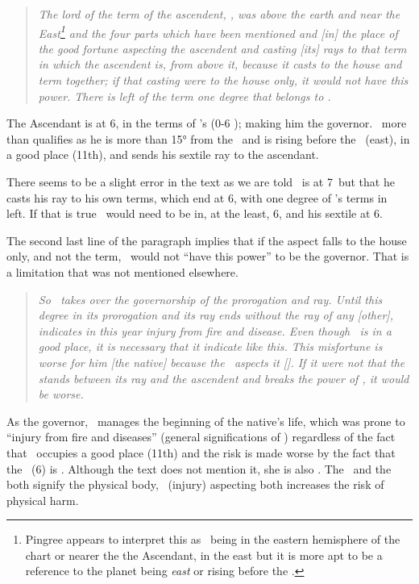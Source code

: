 \begin{quote}
\textsl{The lord of the term of the ascendent, \Mars, was above the earth and near the East\footnote{Pingree appears to interpret this as \Mars\, being in the eastern hemisphere of the chart or nearer the the Ascendant, in the east but it is more apt to be a reference to the planet being \textsl{east} or rising before the \Sun.} and the four parts which have been mentioned and [in] the place of the good fortune aspecting the ascendent and casting [its] rays to that term in which the ascendent is, from above it, because it casts to the house and term together; if that casting were to the house only, it would not have this power. There is left of the term one degree that belongs to \Mars.}
\end{quote}

The Ascendant is at 6\Scorpio, in the terms of \Mars's (0-6 \Scorpio); making him the governor. \Mars\, more than qualifies as he is more than 15° from the \Sun\, and is rising before the \Sun\, (east), in a good place (11th), and sends his sextile ray to the ascendant. 

There seems to be a slight error in the text as we are told \Mars\, is at 7\Virgo\, but that he casts his ray to his own terms, which end at 6\Scorpio, with one degree of \Mars's terms in \Scorpio\, left. If that is true \Mars\, would need to be in, at the least, 6\Virgo, and his sextile at 6\Scorpio. 

The second last line of the paragraph implies that if the aspect falls to the house only, and not the term, \Mars\, would not ``have this power'' to be the governor. That is a limitation that was not mentioned elsewhere.

\begin{quote}
\textsl{So \Mars\, takes over the governorship of the prorogation and ray. Until this degree in its prorogation and its ray ends without the ray of any [other], \Mars\, indicates in this year injury from fire and disease. Even though \Mars\, is in a good place, it is necessary that it indicate like this. This misfortune is worse for him [the native] because the \Moon\, aspects it [\Mars]. If it were not that the \Sun\, stands between its ray and the ascendent and breaks the power of \Mars, it would be worse.}
\end{quote}

As the governor, \Mars\, manages the beginning of the native's life, which was prone to ``injury from fire and diseases'' (general significations of \Mars) regardless of the fact that \Mars\, occupies a good place (11th) and the risk is made worse by the fact that the \Moon\, (6\Cancer) is \Sextile\Mars. Although the text does not mention it, she is also \Trine\ASC. The \Moon\, and the \ASC\, both signify the physical body, \Mars\, (injury) aspecting both increases the risk of physical harm.


